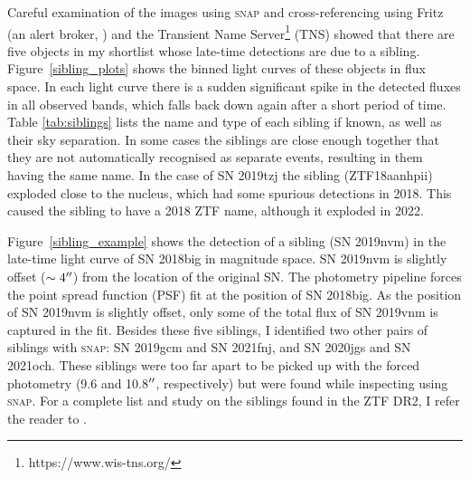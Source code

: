 \documentclass[a4paper,oneside,12pt, class=Latex/Classes/PhDthesisPSnPDF, crop=false]{standalone}
\begin{document}
Careful examination of the images using \textsc{snap} and cross-referencing using Fritz (an alert broker, \citealt{skyportal2019, duev2019realbogus, Kasliwal2019, Skyportal}) and the Transient Name Server\footnote{https://www.wis-tns.org/} (TNS) showed that there are five objects in my shortlist whose late-time detections are due to a sibling. Figure~\ref{sibling_plots} shows the binned light curves of these objects in flux space. In each light curve there is a sudden significant spike in the detected fluxes in all observed bands, which falls back down again after a short period of time. Table \ref{tab:siblings} lists the name and type of each sibling if known, as well as their sky separation. In some cases the siblings are close enough together that they are not automatically recognised as separate events, resulting in them having the same name. In the case of SN 2019tzj the sibling (ZTF18aanhpii) exploded close to the nucleus, which had some spurious detections in 2018. This caused the sibling to have a 2018 ZTF name, although it exploded in 2022.

Figure~\ref{sibling_example} shows the detection of a sibling (SN 2019nvm) in the late-time light curve of SN 2018big in magnitude space. SN 2019nvm is slightly offset ($\sim4^{\prime\prime}$) from the location of the original SN. The photometry pipeline forces the point spread function (PSF) fit at the position of SN 2018big. As the position of SN 2019nvm is slightly offset, only some of the total flux of SN 2019vnm is captured in the fit. Besides these five siblings, I identified two other pairs of siblings with \textsc{snap}: SN 2019gcm and SN 2021fnj, and SN 2020jgs and SN 2021och. These siblings were too far apart to be picked up with the forced photometry (9.6 and 10.8$^{\prime\prime}$, respectively) but were found while inspecting using \textsc{snap}. For a complete list and study on the siblings found in the ZTF DR2, I refer the reader to \citet{DR2_siblings}.
\end{document}
